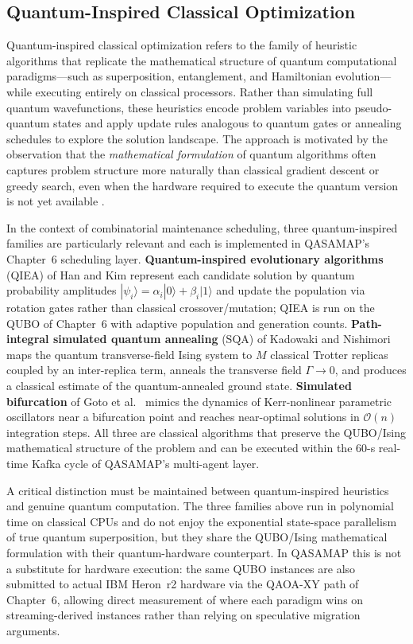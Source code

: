 \subsection{Quantum-Inspired Classical Optimization}

Quantum-inspired classical optimization refers to the family of heuristic algorithms that replicate the mathematical structure of quantum computational paradigms---such as superposition, entanglement, and Hamiltonian evolution---while executing entirely on classical processors. Rather than simulating full quantum wavefunctions, these heuristics encode problem variables into pseudo-quantum states and apply update rules analogous to quantum gates or annealing schedules to explore the solution landscape. The approach is motivated by the observation that the \emph{mathematical formulation} of quantum algorithms often captures problem structure more naturally than classical gradient descent or greedy search, even when the hardware required to execute the quantum version is not yet available \cite{Blekos2024, Preskill2018}.

In the context of combinatorial maintenance scheduling, three quantum-inspired families are particularly relevant and each is implemented in QASAMAP's Chapter~6 scheduling layer. \textbf{Quantum-inspired evolutionary algorithms} (QIEA) of Han and Kim \cite{HanKim2002} represent each candidate solution by quantum probability amplitudes $|\psi_i\rangle = \alpha_i|0\rangle + \beta_i|1\rangle$ and update the population via rotation gates rather than classical crossover/mutation; QIEA is run on the QUBO of Chapter~6 with adaptive population and generation counts. \textbf{Path-integral simulated quantum annealing} (SQA) of Kadowaki and Nishimori \cite{KadowakiNishimori1998} maps the quantum transverse-field Ising system to $M$ classical Trotter replicas coupled by an inter-replica term, anneals the transverse field $\Gamma \to 0$, and produces a classical estimate of the quantum-annealed ground state. \textbf{Simulated bifurcation} of Goto et al.\ \cite{Goto2019} mimics the dynamics of Kerr-nonlinear parametric oscillators near a bifurcation point and reaches near-optimal solutions in $\mathcal{O}(n)$ integration steps. All three are classical algorithms that preserve the QUBO/Ising mathematical structure of the problem and can be executed within the 60-s real-time Kafka cycle of QASAMAP's multi-agent layer.

A critical distinction must be maintained between quantum-inspired heuristics and genuine quantum computation. The three families above run in polynomial time on classical CPUs and do not enjoy the exponential state-space parallelism of true quantum superposition, but they share the QUBO/Ising mathematical formulation with their quantum-hardware counterpart. In QASAMAP this is not a substitute for hardware execution: the same QUBO instances are also submitted to actual IBM Heron~r2 hardware via the QAOA-XY path of Chapter~6, allowing direct measurement of where each paradigm wins on streaming-derived instances rather than relying on speculative migration arguments.

